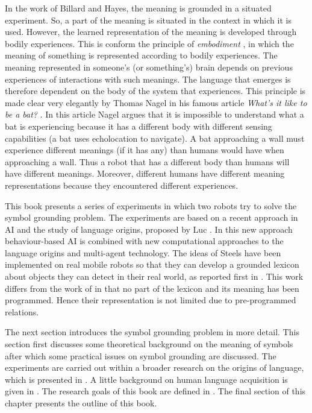 In the work of Billard and Hayes, the meaning is grounded in a situated experiment. So, a part of the meaning is situated in the context in which it is used. However, the learned representation of the meaning is developed through bodily experiences. This is conform the principle of {\em embodiment} \citep{lakoff:1987}, in which the meaning of something is represented according to bodily experiences. The meaning represented in someone's (or something's) brain depends on previous experiences of interactions with such meanings. The language that emerges is therefore dependent on the body of the system that experiences. This principle is made clear very elegantly by Thomas Nagel in his famous article {\em What's it like to be a bat?} \citep{nagel:1974}. In this article Nagel argues that it is impossible to understand what a bat is experiencing because it has a different body with different sensing capabilities (a bat uses echolocation to navigate). A bat approaching a wall must experience different meanings (if it has any) than humans would have when approaching a wall. Thus a robot that has a different body than humans will have different meanings. Moreover, different humans have different meaning representations because they encountered different experiences.

This book presents a series of experiments in which two robots try to solve the symbol grounding problem. The experiments are based on a recent approach in AI and the study of language origins, proposed by Luc \citet{steels:1996a}. In this new approach behaviour-based AI \citep{steelsbrooks:1993} is combined with new computational approaches to the language origins and multi-agent technology. The ideas of Steels have been implemented on real mobile robots so that they can develop a grounded lexicon about objects they can detect in their real world, as reported first in \citep{steelsvogt:1997}. This work differs from the work of \citep{yancostein,billard:1997a} in that no part of the lexicon and its meaning has been programmed. Hence their representation is not limited due to pre-programmed relations.

The next section introduces the symbol grounding problem in more detail. This section first discusses some theoretical background on the meaning of symbols after which some practical issues on symbol grounding are discussed. The experiments are carried out within a broader research on the origins of language, which is presented in . A little background on human language acquisition is given in . The research goals of this book are defined in . The final section of this chapter presents the outline of this book.

